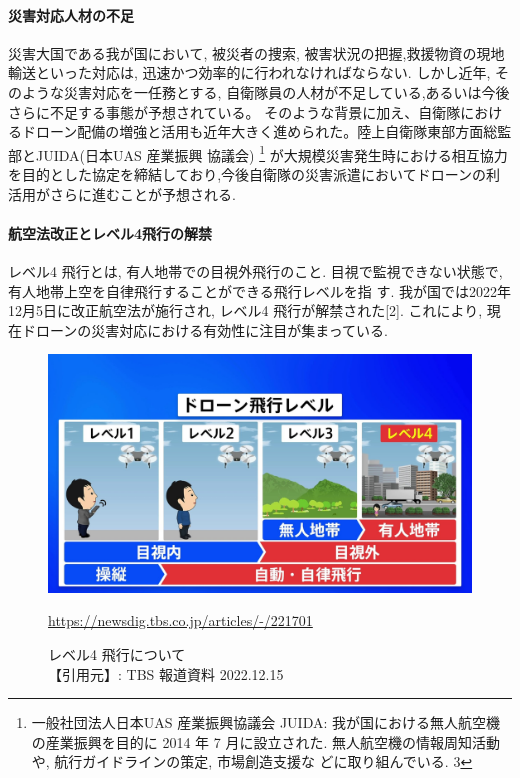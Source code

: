 \documentclass{article}[jsarticle]
\begin{document}
\paragraph{災害対応人材の不足}
災害大国である我が国において, 被災者の捜索, 被害状況の把握,救援物資の現地輸送といった対応は, 迅速かつ効率的に行われなければならない.
しかし近年, そのような災害対応を一任務とする, 自衛隊員の人材が不足している,あるいは今後さらに不足する事態が予想されている。
そのような背景に加え、自衛隊におけるドローン配備の増強と活用も近年大きく進められた。陸上自衛隊東部方面総監部とJUIDA(日本UAS 産業振興
協議会)
\footnote{一般社団法人日本UAS 産業振興協議会 JUIDA: 我が国における無人航空機の産業振興を目的に
2014 年 7 月に設立された. 無人航空機の情報周知活動や, 航行ガイドラインの策定, 市場創造支援な
どに取り組んでいる.
3
}
が大規模災害発生時における相互協力を目的とした協定を締結しており,今後自衛隊の災害派遣においてドローンの利活用がさらに進むことが予想される.


\paragraph{航空法改正とレベル4飛行の解禁}
レベル4 飛行とは, 有人地帯での目視外飛行のこと. 目視で監視できない状態で, 有人地帯上空を自律飛行することができる飛行レベルを指
す. 我が国では2022年12月5日に改正航空法が施行され, レベル4 飛行が解禁された\cite{art1}[2].
これにより, 現在ドローンの災害対応における有効性に注目が集まっている.
\begin{figure}[H]
    \centering
    \includegraphics[scale=0.2]{./images/img_e2902b05dd2c63b869ea3d4f75a4c2e3350873.jpg}
    \caption{
       レベル4 飛行について \\
    【引用元】: TBS 報道資料 2022.12.15 \\
    }
    \url{https://newsdig.tbs.co.jp/articles/-/221701}
\end{figure}
\end{document}
